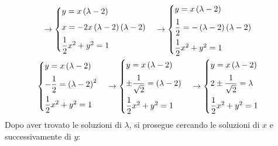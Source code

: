 \documentclass[a4paper]{article}
\begin{document}
\begin{gather*}
		\rightarrow
		\begin{cases}
			y = x\left(\lambda - 2\right) \vspace{.5em}\\
			x = - 2x\left(\lambda - 2\right)\left(\lambda - 2\right) \vspace{.5em}\\
			\dfrac{1}{2}x^{2} + y^{2} = 1
		\end{cases}
		\rightarrow
		\begin{cases}
			y = x\left(\lambda - 2\right) \vspace{.5em}\\
			\dfrac{1}{2} = -\left(\lambda - 2\right)\left(\lambda - 2\right) \vspace{.5em}\\
			\dfrac{1}{2}x^{2} + y^{2} = 1
		\end{cases}
		\\
		\begin{cases}
			y = x\left(\lambda - 2\right) \vspace{.5em}\\
			-\dfrac{1}{2} = \left(\lambda - 2\right)^{2} \vspace{.5em}\\
			\dfrac{1}{2}x^{2} + y^{2} = 1
		\end{cases}
		\rightarrow
		\begin{cases}
			y = x\left(\lambda - 2\right) \vspace{.5em}\\
			\pm \dfrac{1}{\sqrt{2}} = \left(\lambda - 2\right) \vspace{.5em}\\
			\dfrac{1}{2}x^{2} + y^{2} = 1
		\end{cases}
		\rightarrow
		\begin{cases}
			y = x\left(\lambda - 2\right) \vspace{.5em}\\
			2 \pm \dfrac{1}{\sqrt{2}} = \lambda \vspace{.5em}\\
			\dfrac{1}{2}x^{2} + y^{2} = 1
		\end{cases}
	\end{gather*}
	Dopo aver trovato le soluzioni di $\lambda$, si prosegue cercando le soluzioni di $x$ e successivamente di $y$:
\end{document}
